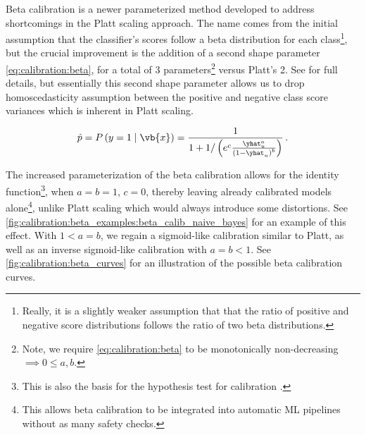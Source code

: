 Beta calibration \cite{beta_calib} is a newer parameterized method developed
to address shortcomings in the Platt scaling approach.
The name comes from the initial assumption that
the classifier's scores follow a beta distribution for each class\footnote{Really,
it is a slightly weaker assumption that
that the ratio of positive and negative score distributions
follows the ratio of two beta distributions.},
but the crucial improvement is the addition of a second shape parameter \cref{eq:calibration:beta},
for a total of 3 parameters\footnote{Note,
we require \cref{eq:calibration:beta} to be monotonically non-decreasing $\implies 0 \leq a,b$.} versus Platt's 2.
See \cite{beta_calib} for full details, but essentially this second shape parameter
allows us to drop homoscedasticity assumption
between the positive and negative class score variances
which is inherent in Platt scaling.

\begin{equation} \label{eq:calibration:beta}
\hat{p} = P\left(y=1 \mid \vb{x}\right) = \frac{1}{1+1/\left(e^{c} \frac{\yhat_{u}^{a}}{\left(1-\yhat_{u}\right)^{b}}\right)}\,.
\end{equation}

The increased parameterization of the beta calibration allows for
the identity function\footnote{This is also the basis for the hypothesis test for calibration \cite{beta_calib}.},
when $a=b=1$, $c=0$, thereby leaving already calibrated models alone\footnote{This allows
beta calibration to be integrated into automatic ML pipelines without as many safety checks.},
unlike Platt scaling which would always introduce some distortions.
See \cref{fig:calibration:beta_examples:beta_calib_naive_bayes} for an example of this effect.
With $1<a=b$, we regain a sigmoid-like calibration similar to Platt,
as well as an inverse sigmoid-like calibration with $a=b<1$.
See \cref{fig:calibration:beta_curves} for an illustration of the possible beta calibration curves.

